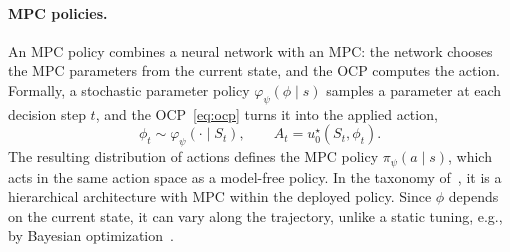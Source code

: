 \documentclass{l4dc2027}
\let\cite\citep
\begin{document}
\paragraph{MPC policies.} An \ac{MPC} policy combines a neural network with
an \ac{MPC}: the network chooses the \ac{MPC} parameters from the current
state, and the \ac{OCP} computes the action. Formally, a stochastic parameter
policy $\varphi_\psi(\phi\mid s)$ samples a parameter at each decision step
$t$, and the \ac{OCP}~\eqref{eq:ocp} turns it into the applied action,
\begin{equation}
  \phi_t\sim\varphi_\psi(\cdot\mid S_t),\qquad
  A_t = u_0^\star(S_t,\phi_t).
  \label{eq:mpc-prior}
\end{equation}
The resulting distribution of actions defines the \ac{MPC} policy
$\pi_\psi(a\mid s)$, which acts in the same action space as a model-free
policy. In the taxonomy of~\cite{reiter2025synthesis}, it is a hierarchical
architecture with \ac{MPC} within the deployed policy. Since $\phi$ depends on
the current state, it can vary along the trajectory, unlike a static tuning,
e.g., by Bayesian optimization~\cite{marco2016automatic}.
\end{document}
